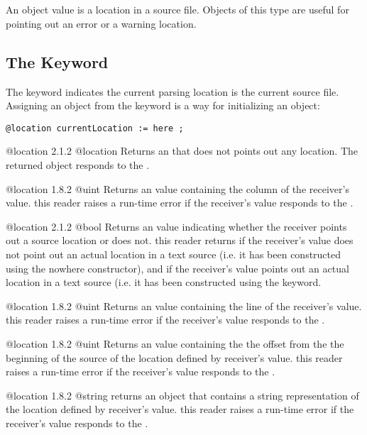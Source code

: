 \section{}\label{@location}

An  object value is a location in a source file. Objects of this type are useful for pointing out an error or a warning location.

\subsection{The  Keyword}

The  keyword indicates the current parsing location is the current source file. Assigning an  object from the  keyword is a way for initializing an  object:\newline

\texttt{@location currentLocation := here ;}

{@location}
{2.1.2}
{@location}
{Returns an  that does not points out any location.}
{The returned object responds  to the .}


{@location}
{1.8.2}
{@uint}
{Returns an  value containing the column of the receiver's value.}
{this reader raises a run-time error if the receiver's value responds  to the .}


{@location}
{2.1.2}
{@bool}
{Returns an  value indicating whether the receiver points out a source location or does not.}
{this reader returns  if the receiver's value does not point out an actual location in a text source (i.e. it has been constructed using the nowhere constructor), and  if the receiver's value points out an actual location in a text source (i.e. it has been constructed using the  keyword.}


{@location}
{1.8.2}
{@uint}
{Returns an  value containing the line of the receiver's value.}
{this reader raises a run-time error if the receiver's value responds  to the .}


{@location}
{1.8.2}
{@uint}
{Returns an  value containing the the offset from the the beginning of the source of the location defined by receiver's value.}
{this reader raises a run-time error if the receiver's value responds  to the .}


{@location}
{1.8.2}
{@string}
{returns an  object that contains a string representation of the location defined by receiver's value.}
{this reader raises a run-time error if the receiver's value responds  to the .}
